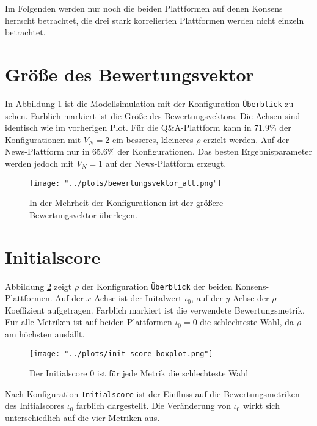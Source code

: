 Im Folgenden werden nur noch die beiden Plattformen auf denen Konsens herrscht betrachtet, die drei stark korrelierten Plattformen werden nicht einzeln betrachtet.


\section{Größe des Bewertungsvektor}

In Abbildung \ref{fig:bewertungsvektor} ist die Modellsimulation mit der Konfiguration \texttt{Überblick}  zu sehen. Farblich markiert ist die Größe des Bewertungsvektors. Die Achsen sind identisch wie im vorherigen Plot. Für die Q\&A-Plattform kann in 71.9\% der Konfigurationen mit $V_N = 2$ ein besseres, kleineres $\rho$ erzielt werden. Auf der News-Plattform nur in 65.6\% der Konfigurationen. Das besten Ergebnisparameter werden jedoch mit $V_N = 1$ auf der News-Plattform erzeugt.

\begin{figure}[!h]	
	\texttt{[image: "../plots/bewertungsvektor\_all.png"]}
	\caption{In der Mehrheit der Konfigurationen ist der größere Bewertungsvektor überlegen.}
	\label{fig:bewertungsvektor}
\end{figure}

\section{Initialscore}

Abbildung \ref{fig:initscore} zeigt $\rho$ der Konfiguration \texttt{Überblick} der beiden Konsens-Plattformen. Auf der $x$-Achse ist der Initalwert $\iota_0$, auf der $y$-Achse der $\rho$-Koeffizient aufgetragen. Farblich markiert ist die verwendete Bewertungsmetrik. Für alle Metriken ist auf beiden Plattformen $\iota_0 = 0$ die schlechteste Wahl, da $\rho$ am höchsten ausfällt.



\begin{figure}[!h]
	\texttt{[image: "../plots/init\_score\_boxplot.png"]}
	\caption{Der Initialscore $0$ ist für jede Metrik die schlechteste Wahl}
	\label{fig:initscore}
\end{figure}


Nach Konfiguration \texttt{Initialscore} ist der Einfluss auf die Bewertungsmetriken des Initialscores $\iota_0$ farblich dargestellt. Die Veränderung von $\iota_0$ wirkt sich unterschiedlich auf die vier Metriken aus. 

